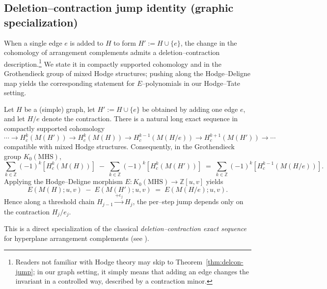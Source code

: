 \documentclass[runningheads]{llncs}
\begin{document}
\subsection{Deletion–contraction jump identity (graphic specialization)}

When a single edge $e$ is added to $H$ to form $H' := H \cup \{e\}$, 
the change in the cohomology of arrangement complements admits a 
deletion–contraction description.\footnote{Readers not familiar with Hodge theory may skip to Theorem~\ref{thm:delcon-jump}; in our graph setting, it simply means that adding an edge changes the invariant in a controlled way, described by a contraction minor.} 
We state it in compactly supported cohomology and in the Grothendieck group of 
mixed Hodge structures; pushing along the Hodge–Deligne map yields the corresponding 
statement for $E$–polynomials in our Hodge–Tate setting.

\begin{theorem}
\label{thm:delcon-jump}
Let $H$ be a (simple) graph, let $H' := H \cup \{e\}$ be obtained by adding one edge $e$, and let $H/e$ denote the contraction.
There is a natural long exact sequence in compactly supported cohomology
\[
\cdots \to H_c^k(M(H')) \to H_c^k(M(H)) \to H_c^{k-1}(M(H/e)) \to H_c^{k+1}(M(H')) \to \cdots
\]
compatible with mixed Hodge structures. Consequently, in the Grothendieck group $K_0(\mathrm{MHS})$,
\[
\sum_{k\in\mathbb{Z}} (-1)^k [H_c^k(M(H))]
\;-\; \sum_{k\in\mathbb{Z}} (-1)^k [H_c^k(M(H'))]
\;=\; \sum_{k\in\mathbb{Z}} (-1)^k [H_c^{k-1}(M(H/e))].
\]
Applying the Hodge–Deligne morphism $E:K_0(\mathrm{MHS})\to\mathbb{Z}[u,v]$ yields
\[
E(M(H);u,v) \;-\; E(M(H');u,v) \;=\; E(M(H/e);u,v).
\]
Hence along a threshold chain $H_{j-1}\xrightarrow{+e_j} H_j$, the per–step jump depends only on the contraction $H_j/e_j$.
\end{theorem}
This is a direct specialization of the classical \emph{deletion–contraction exact sequence} for hyperplane arrangement complements (see \cite{OrlikSolomon1980,OrlikTerao1992,Dimca2017}).


\end{document}
